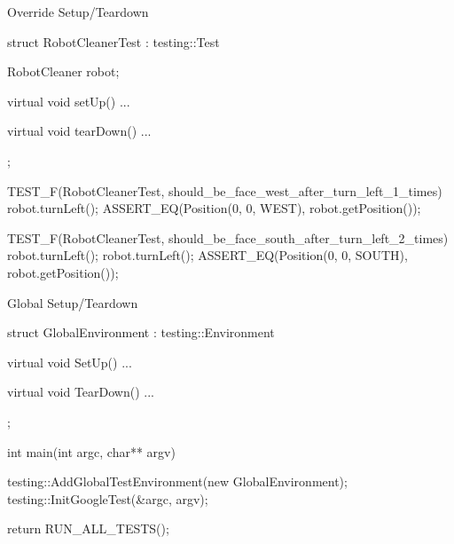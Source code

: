 \begin{frame}[fragile]{Override Setup/Teardown}
\begin{c++}
struct RobotCleanerTest : testing::Test
{
    RobotCleaner robot;

    virtual void setUp()
    { ... }

    virtual void tearDown()
    { ... }
};

TEST_F(RobotCleanerTest, should_be_face_west_after_turn_left_1_times)
{
    robot.turnLeft();
    ASSERT_EQ(Position(0, 0, WEST), robot.getPosition());
}

TEST_F(RobotCleanerTest, should_be_face_south_after_turn_left_2_times)
{
    robot.turnLeft();
    robot.turnLeft();
    ASSERT_EQ(Position(0, 0, SOUTH), robot.getPosition());
}
\end{c++}
\end{frame}

\begin{frame}[fragile]{Global Setup/Teardown}
\begin{c++}
struct GlobalEnvironment : testing::Environment
{
    virtual void SetUp()
    { ... }

    virtual void TearDown()
    { ... }
};

int main(int argc, char** argv)
{
    testing::AddGlobalTestEnvironment(new GlobalEnvironment);
    testing::InitGoogleTest(&argc, argv);

    return RUN_ALL_TESTS();
}
\end{c++}
\end{frame}
